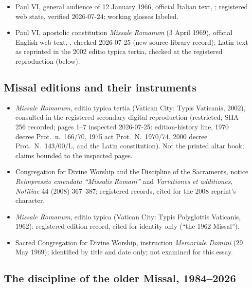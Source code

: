 {\begin{itemize}[itemsep=0pt,parsep=0pt,topsep=0.05em]
\item Paul VI, general audience of 12 January 1966, official Italian text, ; registered web state, verified 2026-07-24; working glosses labeled.
\item Paul VI, apostolic constitution \emph{Missale Romanum} (3 April 1969), official English web text, , checked 2026-07-25 (new source-library record); Latin text as reprinted in the 2002 editio typica tertia, checked at the registered reproduction (below).
\end{itemize}}

\subsection*{Missal editions and their instruments}

{\fontsize{8.6}{9.6}\selectfont
\begin{itemize}[itemsep=0pt,parsep=0pt,topsep=0.05em]
\item \emph{Missale Romanum}, editio typica tertia (Vatican City: Typis Vaticanis, 2002), consulted in the registered secondary digital reproduction (restricted; SHA-256 recorded; pages 1--7 inspected 2026-07-25: edition-history line, 1970 decree Prot.\ n.\ 166/70, 1975 act Prot.\ N.\ 1970/74, 2000 decree Prot.\ N.\ 143/00/L, and the Latin constitution). Not the printed altar book; claims bounded to the inspected pages.
\item Congregation for Divine Worship and the Discipline of the Sacraments, notice \emph{Reimpressio emendata ``Missalis Romani''} and \emph{Variationes et additiones}, \emph{Notitiae} 44 (2008) 367--387; registered records, cited for the 2008 reprint's character.
\item \emph{Missale Romanum}, editio typica (Vatican City: Typis Polyglottis Vaticanis, 1962); registered edition record, cited for identity only (``the 1962 Missal'').
\item Sacred Congregation for Divine Worship, instruction \emph{Memoriale Domini} (29 May 1969); identified by title and date only; not examined for this essay.
\end{itemize}}

\subsection*{The discipline of the older Missal, 1984--2026}

